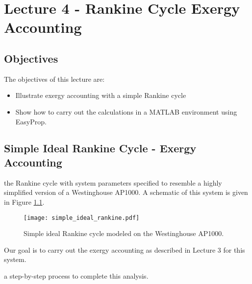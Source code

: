 \chapter{Lecture 4 - Rankine Cycle Exergy Accounting}
\label{ch:ch4}
\section{Objectives}
The objectives of this lecture are:
\begin{itemize}
\item Illustrate exergy accounting with a simple Rankine cycle
\item Show how to carry out the calculations in a MATLAB environment using EasyProp.
\end{itemize}

\section{Simple Ideal Rankine Cycle - Exergy Accounting}
 the Rankine cycle with system parameters specified to resemble a highly simplified version of a Westinghouse AP1000. A schematic of this system is given in Figure \ref{fig:simple_rankine_3}.
\begin{figure}
\texttt{[image: simple\_ideal\_rankine.pdf]}
\caption{Simple ideal Rankine cycle modeled on the Westinghouse AP1000.}
\label{fig:simple_rankine_3}
\end{figure}
Our goal is to carry out the exergy accounting as described in Lecture 3 for this system.  

 a step-by-step process to complete this analysis.

